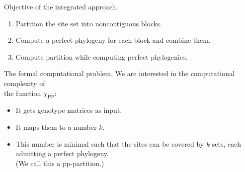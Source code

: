 \documentclass{beamer}
\begin{document}
\begin{frame}{Objective of the integrated approach.}
  \begin{enumerate}
  \item Partition the site set into \alert{noncontiguous} blocks. 
  \item Compute a perfect phylogeny for each block and combine them. 
  \item<alert@1-> Compute partition while computing perfect
    phylogenies. 
  \end{enumerate}

\end{frame}


\begin{frame}{The formal computational problem.}
  We are interested in the computational complexity of \\
  \alert{the function \alert{$\chi_{\operatorname{PP}}$}}:
  \begin{itemize}
  \item It gets genotype matrices as input.
  \item It maps them to a number $k$.
  \item This number is minimal such that the sites can be
    covered by $k$ sets, each admitting a perfect phylogeny.
    \\
    (We call this a \alert{pp-partition}.)
  \end{itemize}
\end{frame}
\end{document}
